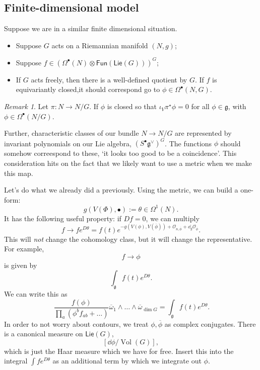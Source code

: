 \documentclass[leqno, openany]{memoir}
\theoremstyle{definition}
\theoremstyle{remark}
\newtheorem{rmk}[thm]{Remark}
\theoremstyle{plain}
\theoremstyle{definition}
\theoremstyle{remark}
\newcommand{\ms}[1]{\mathsf{#1}}
\newcommand{\on}[1]{\operatorname{#1}}
\begin{document}
\subsection{Finite-dimensional model}

Suppose we are in a similar finite dimensional situation.
\begin{itemize}
  \item Suppose $G$ acts on a Riemannian manifold $(N,g)$;
  \item Suppose $f \in (\Omega^{\bullet} (N) \otimes \ms{Fun}(\ms{Lie}(G)))^{G}$;
        \item If $G$ acts freely, then there is a well-defined quotient by $G$. If $f$ is equivariantly closed,it  should correspond go to $\phi \in \Omega^{\bullet}(N,G)$.
\end{itemize}

\begin{rmk}
  Let $\pi : N \to N/G$. If $\phi$ is closed so that $\iota_{V} \pi^{\star}\phi = 0$ for all $\phi \in \mathfrak{g}$, with $\phi \in \Omega^{\bullet}(N/G)$.

    Further, characteristic classes of our bundle $N \to N/G$ are represented by invariant polynomials on our Lie algebra, $(S^{\bullet} \mathfrak{g}^{\vee})^{G}$. The functions $\phi$ should somehow correespond to these, `it looks too good to be a coincidence'. This consideration hits on the fact that we likely want to use a metric when we make this map.
\end{rmk}
Let's do what we already did a previously. Using the metric, we can build a one-form:
\[
g(V(\Phi),\bullet) := \theta \in \Omega^{1}(N).
\]
It has the following useful property: if $Df =0$, we can multiply
\[
f \to f e^{D\theta} = f(t) e^{-g(V(\phi), V(\overline{\phi})) + \mathcal{O}_{n, \overline{\phi}} + \dd_{g} \mathcal{O}_{\overline{\phi}} }.
\]
This will \emph{not} change the cohomology class, but it will change the representative.  For example,
\[
f \to \phi
\]
is given by
\[
\int_{\mathfrak{g}} f(t) e^{D\theta}.
\]
We can write this as
\[
\ \frac{f(\phi)}{\prod_{a}(\phi^{b}f_{ab} + \dots)}\overline{\omega}_{1} \wedge \dots \wedge \overline{\omega}_{\dim G} = \int_{\mathfrak{g}} f(t) e^{D\theta}.
\]
In order to not worry about contours, we treat $\phi, \overline{\phi}$ as complex conjugates. There is a canonical measure on $\ms{Lie}(G)$,
\[
[\dd\phi/\on{Vol}(G)],
\]
which is just the Haar measure which we have for free. Insert this into the integral $\int fe^{D\theta}$ as an additional term by which we integrate out $\phi$.
\end{document}
